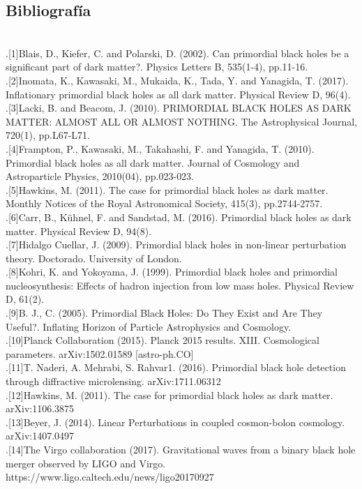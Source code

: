 \documentclass{article}
\begin{document}
\subsection*{Bibliograf\'ia}
\textbf{}
\\.[1]Blais, D., Kiefer, C. and Polarski, D. (2002). Can primordial black holes be a significant part of dark matter?. Physics Letters B, 535(1-4), pp.11-16.
\\.[2]Inomata, K., Kawasaki, M., Mukaida, K., Tada, Y. and Yanagida, T. (2017). Inflationary primordial black holes as all dark matter. Physical Review D, 96(4).
\\.[3]Lacki, B. and Beacom, J. (2010). PRIMORDIAL BLACK HOLES AS DARK MATTER: ALMOST ALL OR ALMOST NOTHING. The Astrophysical Journal, 720(1), pp.L67-L71.
\\.[4]Frampton, P., Kawasaki, M., Takahashi, F. and Yanagida, T. (2010). Primordial black holes as all dark matter. Journal of Cosmology and Astroparticle Physics, 2010(04), pp.023-023.
\\.[5]Hawkins, M. (2011). The case for primordial black holes as dark matter. Monthly Notices of the Royal Astronomical Society, 415(3), pp.2744-2757.
\\.[6]Carr, B., Kühnel, F. and Sandstad, M. (2016). Primordial black holes as dark matter. Physical Review D, 94(8).
\\.[7]Hidalgo Cuellar, J. (2009). Primordial black holes in non-linear perturbation theory. Doctorado. University of London.
\\.[8]Kohri, K. and Yokoyama, J. (1999). Primordial black holes and primordial nucleosynthesis: Effects of hadron injection from low mass holes. Physical Review D, 61(2).
\\.[9]B. J., C. (2005). Primordial Black Holes: Do They Exist and Are They Useful?. Inflating Horizon of Particle Astrophysics and Cosmology.
\\.[10]Planck Collaboration (2015). Planck 2015 results. XIII. Cosmological parameters. arXiv:1502.01589 [astro-ph.CO]
\\.[11]T. Naderi, A. Mehrabi, S. Rahvar1. (2016). Primordial black hole detection through diffractive microlensing. arXiv:1711.06312
\\.[12]Hawkins, M. (2011). The case for primordial black holes as dark matter. arXiv:1106.3875
\\.[13]Beyer, J. (2014). Linear Perturbations in coupled cosmon-bolon cosmology. arXiv:1407.0497
\\.[14]The Virgo collaboration (2017). Gravitational waves from a binary black hole merger observed by LIGO and Virgo. https://www.ligo.caltech.edu/news/ligo20170927
\end{document}
